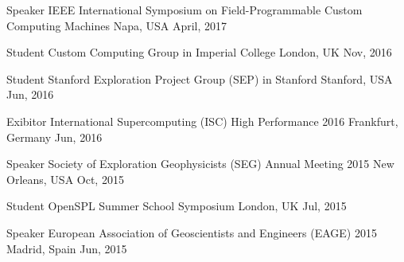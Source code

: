 \documentclass[11pt, a4paper]{awesome-cv}
\begin{document}
\begin{cvhonors}

  \cvhonor
    {Speaker} %
    {IEEE International Symposium on Field-Programmable Custom Computing Machines} %
    {Napa, USA} %
    {April, 2017} %
    
  \cvhonor
    {Student} %
    {Custom Computing Group in Imperial College} %
    {London, UK} %
    {Nov, 2016} %

  \cvhonor
    {Student} %
    {Stanford Exploration Project Group (SEP) in Stanford} %
    {Stanford, USA} %
    {Jun, 2016} %
    
  \cvhonor
    {Exibitor} %
    {International Supercomputing (ISC) High Performance 2016} %
    {Frankfurt, Germany} %
    {Jun, 2016} %

  \cvhonor
    {Speaker} %
    {Society of Exploration Geophysicists (SEG) Annual Meeting 2015} %
    {New Orleans, USA}
    {Oct, 2015} %

  \cvhonor
    {Student} %
    {OpenSPL Summer School Symposium} %
    {London, UK} %
    {Jul, 2015} %

  \cvhonor
    {Speaker} %
    {European Association of Geoscientists and Engineers (EAGE) 2015} %
    {Madrid, Spain} %
    {Jun, 2015} %
\end{cvhonors}

\end{document}
